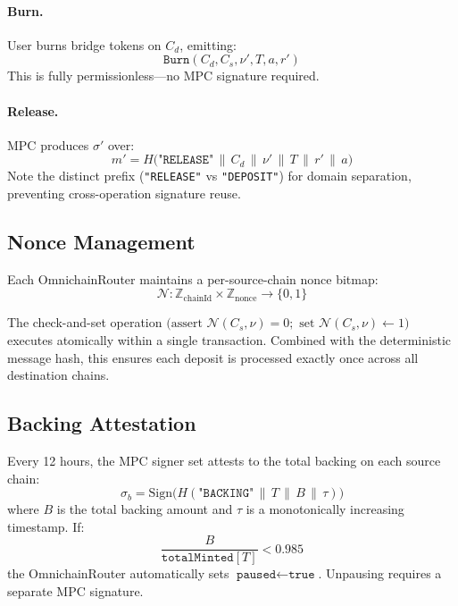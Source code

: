 \documentclass[11pt]{article}
\begin{document}
\paragraph{Burn.} User burns bridge tokens on $C_d$, emitting:
\[
  \texttt{Burn}(C_d, C_s, \nu', T, a, r')
\]
This is fully permissionless---no MPC signature required.

\paragraph{Release.} MPC produces $\sigma'$ over:
\begin{equation}
  m' = H\bigl(\texttt{"RELEASE"} \,\|\, C_d \,\|\, \nu' \,\|\, T \,\|\, r' \,\|\, a\bigr)
\end{equation}
Note the distinct prefix (\texttt{"RELEASE"} vs \texttt{"DEPOSIT"}) for domain separation, preventing cross-operation signature reuse.

\subsection{Nonce Management}

Each OmnichainRouter maintains a per-source-chain nonce bitmap:
\begin{equation}
  \mathcal{N}: \mathbb{Z}_{\text{chainId}} \times \mathbb{Z}_{\text{nonce}} \rightarrow \{0, 1\}
\end{equation}

The check-and-set operation $\bigl(\text{assert } \mathcal{N}(C_s, \nu) = 0; \text{ set } \mathcal{N}(C_s, \nu) \leftarrow 1\bigr)$ executes atomically within a single transaction. Combined with the deterministic message hash, this ensures each deposit is processed exactly once across all destination chains.

\subsection{Backing Attestation}

Every 12 hours, the MPC signer set attests to the total backing on each source chain:
\begin{equation}
  \sigma_b = \text{Sign}\bigl(H(\texttt{"BACKING"} \,\|\, T \,\|\, B \,\|\, \tau)\bigr)
\end{equation}
where $B$ is the total backing amount and $\tau$ is a monotonically increasing timestamp. If:
\begin{equation}
  \frac{B}{\texttt{totalMinted}[T]} < 0.985
\end{equation}
the OmnichainRouter automatically sets $\texttt{paused} \leftarrow \texttt{true}$. Unpausing requires a separate MPC signature.
\end{document}
